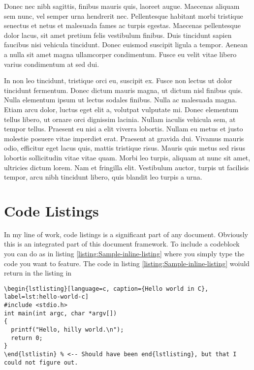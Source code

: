 \documentclass[10pt, a4paper]{article} %
\begin{document}
Donec nec nibh sagittis, finibus mauris quis, laoreet augue. Maecenas aliquam sem nunc, vel semper urna hendrerit nec. Pellentesque habitant morbi tristique senectus et netus et malesuada fames ac turpis egestas. Maecenas pellentesque dolor lacus, sit amet pretium felis vestibulum finibus. Duis tincidunt sapien faucibus nisi vehicula tincidunt. Donec euismod suscipit ligula a tempor. Aenean a nulla sit amet magna ullamcorper condimentum. Fusce eu velit vitae libero varius condimentum at sed dui.

In non leo tincidunt, tristique orci eu, suscipit ex. Fusce non lectus ut dolor tincidunt fermentum. Donec dictum mauris magna, ut dictum nisl finibus quis. Nulla elementum ipsum ut lectus sodales finibus. Nulla ac malesuada magna. Etiam arcu dolor, luctus eget elit a, volutpat vulputate mi. Donec elementum tellus libero, ut ornare orci dignissim lacinia. Nullam iaculis vehicula sem, at tempor tellus. Praesent eu nisi a elit viverra lobortis. Nullam eu metus et justo molestie posuere vitae imperdiet erat. Praesent at gravida dui. Vivamus mauris odio, efficitur eget lacus quis, mattis tristique risus. Mauris quis metus sed risus lobortis sollicitudin vitae vitae quam. Morbi leo turpis, aliquam at nunc sit amet, ultricies dictum lorem. Nam et fringilla elit. Vestibulum auctor, turpis ut facilisis tempor, arcu nibh tincidunt libero, quis blandit leo turpis a urna.

\section{Code Listings}
In my line of work, code listings is a significant part of any document. Obviously this is an integrated part of this document framework. To include a codeblock you can do as in listing \ref{listing:Sample-inline-listing} where you simply type the code you want to feature. The code in listing \ref{listing:Sample-inline-listing} woiuld return in the listing in 
\begin{lstlisting}[language=Tex, caption={An example of inline listing}, label=listing:Sample-inline-listing]
\begin{lstlisting}[language=c, caption={Hello world in C}, label=lst:hello-world-c]
#include <stdio.h>
int main(int argc, char *argv[])
{
  printf("Hello, hilly world.\n");
  return 0;
}
\end{lstlistin} % <-- Should have been end{lstlisting}, but that I could not figure out.	
\end{lstlisting}
\end{document}
